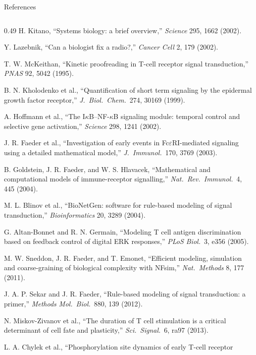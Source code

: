 \documentclass[aspectratio=169,10pt,t]{beamer}
\begin{document}
\begin{frame}{References}
  \tiny
  \setlength\parskip{0.6mm}
  \begin{columns}[T]
    \begin{column}{0.49\textwidth}
      H. Kitano, ``Systems biology: a brief overview,'' \emph{Science} 295, 1662 (2002).\par
      Y. Lazebnik, ``Can a biologist fix a radio?,'' \emph{Cancer Cell} 2, 179 (2002).\par
      T. W. McKeithan, ``Kinetic proofreading in T-cell receptor signal transduction,''
        \emph{PNAS} 92, 5042 (1995).\par
      B. N. Kholodenko et al., ``Quantification of short term signaling by the epidermal
        growth factor receptor,'' \emph{J.\ Biol.\ Chem.}\ 274, 30169 (1999).\par
      A. Hoffmann et al., ``The I$\kappa$B--NF-$\kappa$B signaling module: temporal control
        and selective gene activation,'' \emph{Science} 298, 1241 (2002).\par
      J. R. Faeder et al., ``Investigation of early events in Fc$\varepsilon$RI-mediated
        signaling using a detailed mathematical model,'' \emph{J.\ Immunol.}\ 170, 3769 (2003).\par
      B. Goldstein, J. R. Faeder, and W. S. Hlavacek, ``Mathematical and computational models
        of immune-receptor signalling,'' \emph{Nat.\ Rev.\ Immunol.}\ 4, 445 (2004).\par
      M. L. Blinov et al., ``BioNetGen: software for rule-based modeling of signal
        transduction,'' \emph{Bioinformatics} 20, 3289 (2004).\par
      G. Altan-Bonnet and R. N. Germain, ``Modeling T cell antigen discrimination based on
        feedback control of digital ERK responses,'' \emph{PLoS Biol.}\ 3, e356 (2005).\par
      M. W. Sneddon, J. R. Faeder, and T. Emonet, ``Efficient modeling, simulation and
        coarse-graining of biological complexity with NFsim,'' \emph{Nat.\ Methods} 8, 177 (2011).\par
      J. A. P. Sekar and J. R. Faeder, ``Rule-based modeling of signal transduction: a
        primer,'' \emph{Methods Mol.\ Biol.}\ 880, 139 (2012).\par
      N. Miskov-Zivanov et al., ``The duration of T cell stimulation is a critical determinant
        of cell fate and plasticity,'' \emph{Sci.\ Signal.}\ 6, ra97 (2013).\par
      L. A. Chylek et al., ``Phosphorylation site dynamics of early T-cell receptor

\end{column}
\end{columns}
\end{frame}
\end{document}
